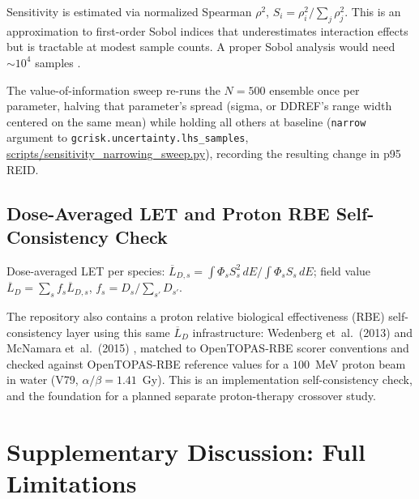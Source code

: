 \documentclass[a4paper,fleqn]{cas-sc}
\newcommand{\code}[1]{\texttt{#1}}
\begin{document}
Sensitivity is estimated via normalized Spearman $\rho^2$,
$S_i=\rho_i^2/\sum_j\rho_j^2$. This is an approximation to first-order Sobol
indices that underestimates interaction effects but is tractable at modest
sample counts. A proper Sobol analysis would need $\sim\!10^4$ samples
\citep{saltelli2010}.

The value-of-information sweep re-runs the $N=500$ ensemble once per
parameter, halving that parameter's spread (sigma, or DDREF's range width
centered on the same mean) while holding all others at baseline
(\code{narrow} argument to \code{gcrisk.uncertainty.lhs\_samples},
\url{scripts/sensitivity_narrowing_sweep.py}), recording the resulting
change in p95 REID.

\subsection{Dose-Averaged LET and Proton RBE Self-Consistency Check}

Dose-averaged LET per species: $\overline{L}_{D,s} = \int\Phi_sS_s^2\,dE
/ \int\Phi_sS_s\,dE$; field value $\overline{L}_D=\sum_sf_s\overline{L}_{D,s}$,
$f_s=D_s/\sum_{s'}D_{s'}$.

The repository also contains a proton relative biological effectiveness
(RBE) self-consistency layer using this
same $\overline{L}_D$ infrastructure: Wedenberg et~al.\ (2013)
\citep{wedenberg2013} and McNamara et~al.\ (2015) \citep{mcnamara2015},
matched to OpenTOPAS-RBE scorer conventions and checked against
OpenTOPAS-RBE reference values for a $100$~MeV proton beam in water (V79,
$\alpha/\beta=1.41$~Gy). This is an implementation self-consistency check,
and the foundation for a planned separate proton-therapy crossover
study.

\section{Supplementary Discussion: Full Limitations}
\end{document}
